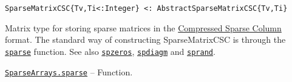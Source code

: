 \begin{adjustwidth}{2em}{0pt}


\begin{verbatim}
SparseMatrixCSC{Tv,Ti<:Integer} <: AbstractSparseMatrixCSC{Tv,Ti}
\end{verbatim}

Matrix type for storing sparse matrices in the \hyperlink{4286524230912717228}{Compressed Sparse Column} format. The standard way of constructing SparseMatrixCSC is through the \hyperlink{10167157011990389788}{\texttt{sparse}} function. See also \hyperlink{10306793690101482847}{\texttt{spzeros}}, \hyperlink{10407455986460913397}{\texttt{spdiagm}} and \hyperlink{10437881912081266792}{\texttt{sprand}}.



\end{adjustwidth}
\hypertarget{10167157011990389788}{}
\hyperlink{10167157011990389788}{\texttt{SparseArrays.sparse}}  -- {Function.}


